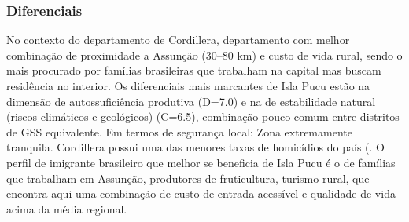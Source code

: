 \subsubsection*{Diferenciais}\label{dif-isla-pucu-0308}
No contexto do departamento de Cordillera, departamento com melhor combinação de proximidade a Assunção (30–80 km) e custo de vida rural, sendo o mais procurado por famílias brasileiras que trabalham na capital mas buscam residência no interior. Os diferenciais mais marcantes de Isla Pucu estão na dimensão de autossuficiência produtiva (D=7.0) e na de estabilidade natural (riscos climáticos e geológicos) (C=6.5), combinação pouco comum entre distritos de GSS equivalente. Em termos de segurança local: Zona extremamente tranquila. Cordillera possui uma das menores taxas de homicídios do país (. O perfil de imigrante brasileiro que melhor se beneficia de Isla Pucu é o de famílias que trabalham em Assunção, produtores de fruticultura, turismo rural, que encontra aqui uma combinação de custo de entrada acessível e qualidade de vida acima da média regional.
